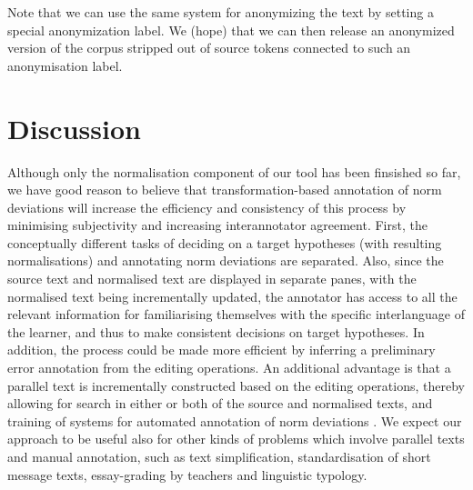 \documentclass[10pt, a4paper]{article}
\newcommand{\elena}[1]{{\color{BrickRed}{Elena: #1}}}
\newcommand{\normAnn}[0]{our tool }
\begin{document}
Note that we can use the same system for anonymizing the text by setting a special anonymization label. We (hope) that we can
then release an anonymized version of the corpus stripped out of source tokens connected to such an anonymisation label.

\elena{Also something about about our intended error categories? Yes, I will add a bit on this}

\section{Discussion}
\label{sec:discussion}


Although only the normalisation component of \normAnn has been finsished so far, we have good reason to believe that transformation-based annotation of norm deviations will increase the efficiency and consistency of this process by minimising subjectivity and increasing interannotator agreement.
First, the conceptually different tasks of deciding on a target hypotheses (with resulting normalisations) and annotating norm deviations are separated. Also, since the source text and normalised text are displayed in separate panes, with the normalised text being incrementally updated, the annotator has access to all the relevant information for familiarising themselves with the specific interlanguage of the learner, and thus to make consistent decisions on target hypotheses. In addition, the process could be made more efficient by inferring a preliminary error annotation from the editing operations. An additional advantage is that a parallel text is incrementally constructed based on the editing operations, thereby allowing for search in either or both of the source and normalised texts, and training of systems for automated annotation of norm deviations \cite{sproat2016rnn}. We expect our approach to be useful also for other kinds of problems which involve parallel texts and manual annotation, such as text simplification, standardisation of short message texts, essay-grading by teachers and linguistic typology. %
\end{document}
